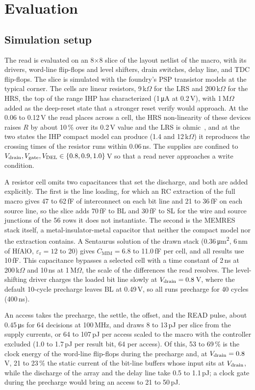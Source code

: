 \section{Evaluation}
\label{sec:eval}
\subsection{Simulation setup}
The read is evaluated on an 8$\times$8 slice of the layout netlist of the macro, with its drivers, word-line flip-flops and level shifters, drain switches, delay line, and TDC flip-flops.
The slice is simulated with the foundry's PSP transistor models at the typical corner.
The cells are linear resistors, 9\,k$\Omega$ for the LRS and 200\,k$\Omega$ for the HRS, the top of the range IHP has characterized (1\,\si{\micro\ampere} at 0.2\,V), with 1\,M$\Omega$ added as the deep-reset state that a stronger reset verify would approach.
At the 0.06 to 0.12\,V the read places across a cell, the HRS non-linearity of these devices raises $R$ by about 10\,\% over its 0.2\,V value and the LRS is ohmic~\cite{zanotti2026model}, and at the two states the IHP compact model can produce (1.4 and 12\,k$\Omega$) it reproduces the crossing times of the resistor runs within 0.06\,ns.
The supplies are confined to $V_\mathrm{drain},V_\mathrm{gate},V_\mathrm{DEL}\in\{0.8,0.9,1.0\}$\,V so that a read never approaches a write condition.

A resistor cell omits two capacitances that set the discharge, and both are added explicitly.
The first is the line loading, for which an RC extraction of the full macro gives 47 to 62\,fF of interconnect on each bit line and 21 to 36\,fF on each source line, so the slice adds 70\,fF to BL and 30\,fF to SL for the wire and source junctions of the 56 rows it does not instantiate.
The second is the MEMRES stack itself, a metal-insulator-metal capacitor that neither the compact model nor the extraction contains.
A Sentaurus solution of the drawn stack (0.36\,\si{\micro\meter\squared}, 6\,nm of HfAlO, $\varepsilon_\mathrm{r}=12$ to 20) gives $C_\mathrm{MIM}=6.8$ to 11.0\,fF per cell, and all results use 10\,fF.
This capacitance bypasses a selected cell with a time constant of 2\,ns at 200\,k$\Omega$ and 10\,ns at 1\,M$\Omega$, the scale of the differences the read resolves.
The level-shifting driver charges the loaded bit line slowly at $V_\mathrm{drain}=0.8$\,V, where the default 10-cycle precharge leaves BL at 0.49\,V, so all runs precharge for 40 cycles (400\,ns).

An access takes the precharge, the settle, the offset, and the READ pulse, about 0.45\,\si{\micro\second} for 64 decisions at 100\,MHz, and draws 8 to 13\,pJ per slice from the supply currents, or 64 to 107\,pJ per access scaled to the macro with the controller excluded (1.0 to 1.7\,pJ per result bit, 64 per access).
Of this, 53 to 69\,\% is the clock energy of the word-line flip-flops during the precharge and, at $V_\mathrm{drain}=0.8$\,V, 21 to 23\,\% the static current of the bit-line buffers whose input sits at $V_\mathrm{drain}$, while the discharge of the array and the delay line take 0.5 to 1.1\,pJ; a clock gate during the precharge would bring an access to 21 to 50\,pJ.

